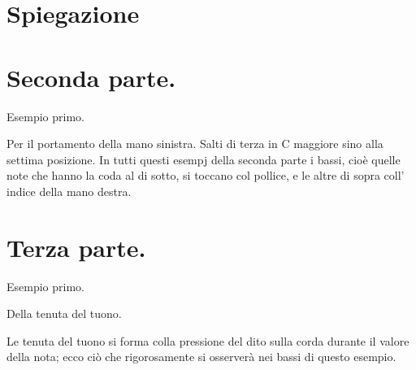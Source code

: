\documentclass[a4paper]{article}
\begin{document}
\section*{Spiegazione}

\clearpage
\section*{Seconda parte.}

Esempio primo.

Per il portamento della mano sinistra.  Salti di terza in C maggiore sino alla settima posizione.  In tutti questi esempj della seconda parte i bassi, cioè quelle note che hanno la coda al di sotto, si toccano col pollice, e le altre di sopra coll' indice della mano destra.


\clearpage
\section*{Terza parte.}

Esempio primo.

Della tenuta del tuono.

Le tenuta del tuono si forma colla pressione del dito sulla corda durante il valore della nota; ecco ciò che rigorosamente si osserverà nei bassi di questo esempio.
\end{document}
